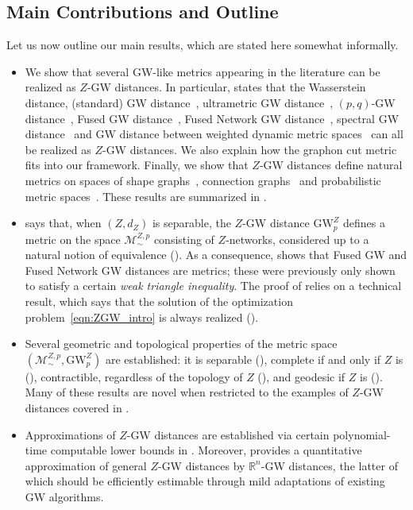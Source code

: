 \documentclass[twoside,11pt]{article}
\theoremstyle{definition}
\newcommand{\M}{\mathcal{M}}
\newcommand{\MZp}{\M_{\sim}^{Z,p}}
\newcommand{\R}{\mathbb{R}}
\begin{document}
\subsection{Main Contributions and Outline}

Let us now outline our main results, which are stated here somewhat informally.

\begin{itemize}[leftmargin=*]
    \item We show that several GW-like metrics appearing in the literature can be realized as $Z$-GW distances. In particular,  states that the Wasserstein distance, (standard) GW distance~\citep{memoli2007}, ultrametric GW distance~\citep{memoli2021ultrametric}, $(p,q)$-GW distance~\citep{arya2023gromov}, Fused GW distance~\citep{vayer2020fused}, Fused Network GW distance~\citep{yang2023exploiting}, spectral GW distance~\citep{memoli2009spectral} and GW distance between weighted dynamic metric spaces~\citep{woojin-thesis} can all be realized as $Z$-GW distances. 
    We also explain how the graphon cut metric~\citep{borgs2008convergent} fits into our framework. Finally, we show that $Z$-GW distances define natural metrics on spaces of shape graphs~\citep{guo2022statistical}, connection graphs~\citep{robertson2023generalization} and probabilistic metric spaces~\citep{menger1942statistical}. These results are summarized in .
    \item {} says that, when $(Z,d_Z)$ is separable, the $Z$-GW distance $\mathrm{GW}_p^Z$ defines a metric on the space $\MZp$ consisting of $Z$-networks, considered up to a natural notion of equivalence (). As a consequence,  shows that Fused GW and Fused Network GW distances are metrics; these were previously only shown to satisfy a certain \emph{weak triangle inequality}.
    The proof of  relies on a technical result, which says that the solution of the optimization problem~\eqref{eqn:ZGW_intro} is always realized ().
    \item Several geometric and topological properties of the metric space $(\MZp, \mathrm{GW}_p^Z)$ are established: it is separable (), complete if and only if $Z$ is (), contractible, regardless of the topology of $Z$ (), and geodesic if $Z$ is (). Many of these results are novel when restricted to the examples of $Z$-GW distances covered in .
    \item Approximations of $Z$-GW distances are established via certain polynomial-time computable lower bounds in . Moreover,  provides a quantitative approximation of general $Z$-GW distances by $\R^n$-GW distances, the latter of which should be efficiently estimable through mild adaptations of existing GW algorithms. 
\end{itemize}
\end{document}
